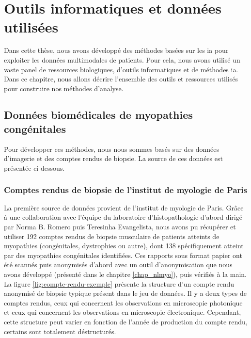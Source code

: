 \chapter{Outils informatiques et données utilisées}

Dans cette thèse, nous avons développé des méthodes basées sur les \gls{ia} pour exploiter les données multimodales de patients. Pour cela, nous avons utilisé un vaste panel de ressources biologiques, d'outils informatiques et de méthodes \gls{ia}. Dans ce chapitre, nous allons décrire l'ensemble des outils et ressources utilisés pour construire nos méthodes d'analyse.

\section{Données biomédicales de myopathies congénitales}
Pour développer ces méthodes, nous nous sommes basés sur des données d'imagerie et des comptes rendus de biopsie. La source de ces données est présentée ci-dessous.

\subsection{Comptes rendus de biopsie de l'institut de myologie de Paris}
La première source de données provient de l'institut de myologie de Paris. Grâce à une collaboration avec l'équipe du laboratoire d’histopathologie d'abord dirigé par Norma B. Romero puis Teresinha Evangelista, nous avons pu récupérer et utiliser 192 comptes rendus de biopsie musculaire de patients atteints de myopathies (congénitales, dystrophies ou autre), dont 138 spécifiquement atteint par des myopathies congénitales identifiées. Ces rapports sous format papier ont été scannés puis anonymisés d'abord avec un outil d'anonymisation que nous avons développé (présenté dans le chapitre \ref{chap_nlmyo}), puis vérifiés à la main. La figure \ref{fig:compte-rendu-exemple} présente la structure d'un compte rendu anonymisé de biopsie typique présent dans le jeu de données. Il y a deux types de comptes rendus, ceux qui concernent les observations en microscopie photonique et ceux qui concernent les observations en microscopie électronique. Cependant, cette structure peut varier en fonction de l'année de production du compte rendu, certains sont totalement déstructurés.

